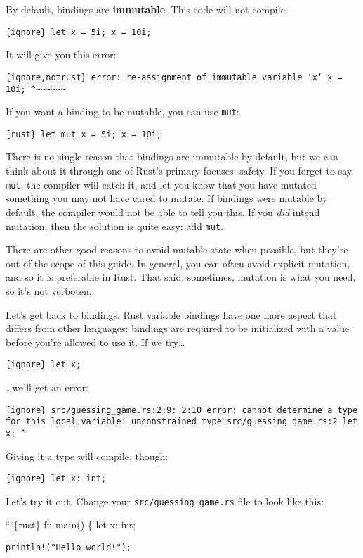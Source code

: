 \documentclass[]{article}
\begin{document}
By default, bindings are \textbf{immutable}. This code will not compile:

\texttt{\{ignore\} let x = 5i; x = 10i;}

It will give you this error:

\texttt{\{ignore,notrust\} error: re-assignment of immutable variable `x`      x = 10i;      \^{}\textasciitilde{}\textasciitilde{}\textasciitilde{}\textasciitilde{}\textasciitilde{}\textasciitilde{}}

If you want a binding to be mutable, you can use \texttt{mut}:

\texttt{\{rust\} let mut x = 5i; x = 10i;}

There is no single reason that bindings are immutable by default, but we
can think about it through one of Rust's primary focuses: safety. If you
forget to say \texttt{mut}, the compiler will catch it, and let you know
that you have mutated something you may not have cared to mutate. If
bindings were mutable by default, the compiler would not be able to tell
you this. If you \emph{did} intend mutation, then the solution is quite
easy: add \texttt{mut}.

There are other good reasons to avoid mutable state when possible, but
they're out of the scope of this guide. In general, you can often avoid
explicit mutation, and so it is preferable in Rust. That said,
sometimes, mutation is what you need, so it's not verboten.

Let's get back to bindings. Rust variable bindings have one more aspect
that differs from other languages: bindings are required to be
initialized with a value before you're allowed to use it. If we
try\ldots{}

\texttt{\{ignore\} let x;}

\ldots{}we'll get an error:

\texttt{\{ignore\} src/guessing\_game.rs:2:9: 2:10 error: cannot determine a type for this local variable: unconstrained type src/guessing\_game.rs:2     let x;                                \^{}}

Giving it a type will compile, though:

\texttt{\{ignore\} let x: int;}

Let's try it out. Change your \texttt{src/guessing\_game.rs} file to
look like this:

```\{rust\} fn main() \{ let x: int;

\begin{verbatim}
println!("Hello world!");
\end{verbatim}
\end{document}
